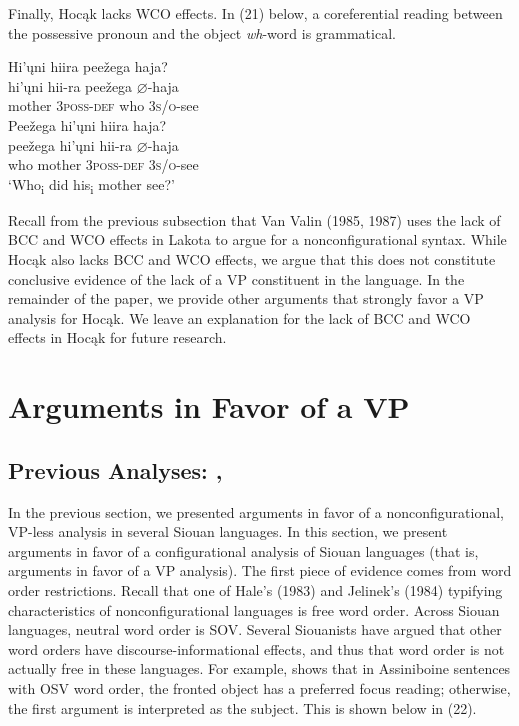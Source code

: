 \documentclass[output=paper]{LSP/langsci}
\begin{document}
Finally, Hocąk lacks WCO effects. In (21) below, a coreferential reading between the possessive pronoun and the object \textit{wh}-word is grammatical.

\begin{exe}
\ex
\begin{xlist}
\ex	
\glll Hi'\k{u}ni		hiira					pee\v{z}ega		haja? \\
hi'\k{u}ni		hii-ra 			pee\v{z}ega		$\varnothing$-haja \\
	mother		3\textsc{poss-def}		who	\textsc{3s/o}-see \\
\ex 
\glll Pee\v{z}ega 	hi'\k{u}ni 		hiira		haja?\\
pee\v{z}ega 	hi'\k{u}ni 		hii-ra 		$\varnothing$-haja \\
	who 	mother 	3\textsc{poss-def} 	\textsc{3s/o}-see \\
\trans `Who\textsubscript{i} did his\textsubscript{i} mother see?'
\end{xlist}
\end{exe}

Recall from the previous subsection that Van Valin (1985, 1987) uses the lack of BCC and WCO effects in Lakota to argue for a nonconfigurational syntax. While Hocąk also lacks BCC and WCO effects, we argue that this does not constitute conclusive evidence of the lack of a VP constituent in the language. In the remainder of the paper, we provide other arguments that strongly favor a VP analysis for Hocąk. We leave an explanation for the lack of BCC and WCO effects in Hocąk for future research.

\section{Arguments in Favor of a VP}

\subsection{Previous Analyses: \citet{Boyle2007}, \citet{Graczyk1991} \citet{West2003}}

In the previous section, we presented arguments in favor of a nonconfigurational, VP-less analysis in several Siouan languages.  In this section, we present arguments in favor of a configurational analysis of Siouan languages (that is, arguments in favor of a VP analysis).  The first piece of evidence comes from word order restrictions. Recall that one of Hale's (1983) and Jelinek's (1984) typifying characteristics of nonconfigurational languages is free word order.  Across Siouan languages, neutral word order is SOV.  Several Siouanists have argued that other word orders have discourse-informational effects, and thus that word order is not actually free in these languages. For example, \citet{West2003} shows that in Assiniboine sentences with OSV word order, the fronted object has a preferred focus reading; otherwise, the first argument is interpreted as the subject. This is shown below in (22). 
\end{document}
